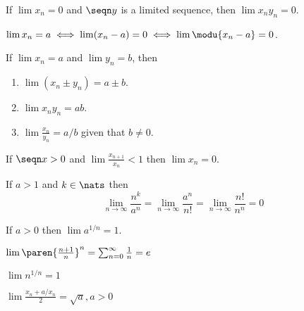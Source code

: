 \begin{theorem}
	If $\lim x_n = 0$ and $\seqn y$ is a limited sequence, then $\lim x_ny_n=0$.
\end{theorem}

\begin{fact}
	$\lim x_n = a \iff \lim (x_n - a) = 0 \iff \lim \modu{x_n - a} = 0$.
\end{fact}

\begin{theorem}
	If $\lim x_n = a$ and $\lim y_n = b$, then
	\begin{enumerate}
		\item $\lim (x_n \pm y_n) = a \pm b$.
		\item $\lim x_n y_n = ab$.
		\item $\lim \frac{x_n}{y_n} = a/b$ given that $b \ne 0$.
	\end{enumerate}
\end{theorem}

\begin{fact}
	If $\seqn x > 0$ and $\lim \frac{x_{n+1}}{x_n}<1$ then $\lim x_n=0$.
\end{fact}

\begin{fact}
	If $a > 1$ and $k \in \nats$ then $$\lim\limits_{n\to\infty} \frac{n^k}{a^n} = 
	\lim\limits_{n\to\infty} \frac{a^n}{n!} = \lim\limits_{n\to\infty} \frac{n!}{n^n}
	=0$$
\end{fact}

\begin{fact}
	If $a>0$ then $\lim a^{1/n}=1$.
\end{fact}

\begin{fact}
	$\lim \paren{\frac{n+1}{n}}^n = \sum_{n=0}^{\infty}\frac1n = e$
\end{fact}

\begin{fact}
	$\lim n^{1/n}=1$
\end{fact}

\begin{fact}
	$\lim\frac{x_n+a/x_n}2=\sqrt a, a>0$
\end{fact}